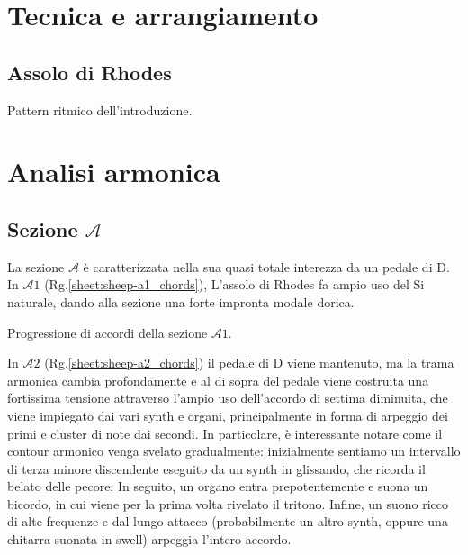 \documentclass[class=book, crop=false, oneside, 12pt]{standalone}
\begin{document}
    \section{Tecnica e arrangiamento}
    \label{sec:03-arrangement}

    \subsection{Assolo di Rhodes}

    \begin{sheet}[htbp]
        \centering
        \caption{Pattern ritmico dell'introduzione.}
        \label{sheet:sheep-epiano_solo}
    \end{sheet}

    \section{Analisi armonica}
    \label{sec:03-harmony}

    \subsection*{Sezione \(\mathcal{A}\)}
    La sezione \(\mathcal{A}\) è caratterizzata nella sua quasi totale interezza da un pedale di D. In \(\mathcal{A}1\) (Rg.\ref{sheet:sheep-a1_chords}), L'assolo di Rhodes fa ampio uso del Si naturale, dando alla sezione una forte impronta modale dorica.     
    
    \begin{sheet}[htbp]
        \centering
        \caption{Progressione di accordi della sezione \(\mathcal{A}1\).}
        \label{sheet:sheep-a1_chords}
    \end{sheet}

    In \(\mathcal{A}2\) (Rg.\ref{sheet:sheep-a2_chords}) il pedale di D viene mantenuto, ma la trama armonica cambia profondamente e al di sopra del pedale viene costruita una fortissima tensione attraverso l'ampio uso dell'accordo di settima diminuita, che viene impiegato dai vari synth e organi, principalmente in forma di arpeggio dei primi e cluster di note dai secondi. In particolare, è interessante notare come il contour armonico venga svelato gradualmente: inizialmente sentiamo un intervallo di terza minore discendente eseguito da un synth in glissando, che ricorda il belato delle pecore. In seguito, un organo entra prepotentemente e suona un bicordo, in cui viene per la prima volta rivelato il tritono. Infine, un suono ricco di alte frequenze e dal lungo attacco (probabilmente un altro synth, oppure una chitarra suonata in swell) arpeggia l'intero accordo. 
    
\end{document}
